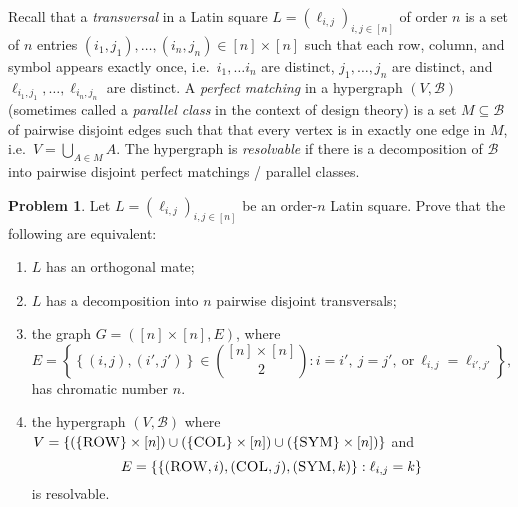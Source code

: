 \documentclass[11pt, letter]{amsart}
\theoremstyle{definition}
\newtheorem{problem}{Problem}[]
\newcommand{\cB}{\ensuremath{\mathcal B}}
\begin{document}
\clearpage

Recall that a \textit{transversal} in a Latin square $L = (\ell_{i,j})_{i,j\in[n]}$ of order $n$ is a set of $n$ entries $(i_1, j_1), \dots, (i_n, j_n) \in [n]\times [n]$ such that each row, column, and symbol appears exactly once, i.e.\ $i_1, \dots i_n$ are distinct, $j_1, \dots, j_n$ are distinct, and $\ell_{i_1,j_1}, \dots, \ell_{i_n, j_n}$ are distinct.  A \textit{perfect matching} in a hypergraph $(V, \cB)$ (sometimes called a \textit{parallel class} in the context of design theory) is a set $M \subseteq \cB$ of pairwise disjoint edges such that that every vertex is in exactly one edge in $M$, i.e.\ $V = \bigcup_{A \in M}A$.  The hypergraph is \textit{resolvable} if there is a decomposition of $\cB$ into pairwise disjoint perfect matchings / parallel classes.
\begin{problem}Let $L = (\ell_{i,j})_{i,j\in[n]}$ be an order-$n$ Latin square.  Prove that the following are equivalent:
  \begin{enumerate}[label=(\alph*)]
  \item $L$ has an orthogonal mate;
  \item $L$ has a decomposition into $n$ pairwise disjoint transversals;
  \item the graph $G = ([n]\times [n], E)$, where
    \begin{equation*}
      E = \left\{\left\{(i,j),(i',j')\right\}\in \binom{[n]\times[n]}{2} : i = i',~j = j',~\text{or}~\ell_{i,j} = \ell_{i',j'}\right\},
    \end{equation*}
    has chromatic number $n$.
  \item the hypergraph $(V, \cB)$ where $V = \{(\{\textsc{ROW}\}\times [n]) \cup (\{\textsc{COL}\}\times [n]) \cup (\{\textsc{SYM}\}\times [n])\}$ and
    \begin{equation*}
      E = \left\{\left\{(\textsc{ROW}, i), (\textsc{COL}, j), (\textsc{SYM}, k)\right\} : \ell_{i,j} = k\right\}
    \end{equation*}
    is resolvable.
  \end{enumerate}
\end{problem}
\end{document}
